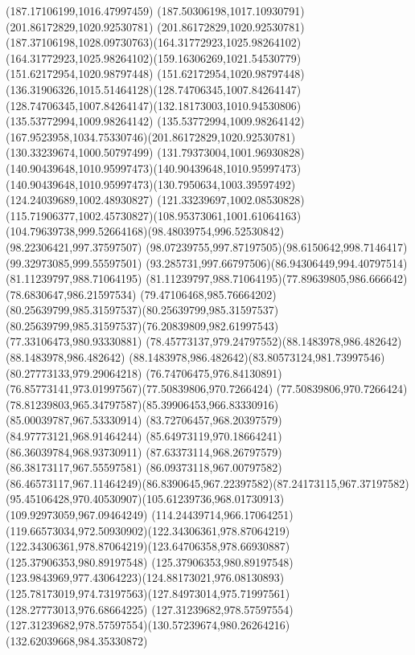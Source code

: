 {{\lineto(187.17106199,1016.47997459)
\lineto(187.50306198,1017.10930791)
\closepath
\moveto(201.86172829,1020.92530781)
\curveto(201.86172829,1020.92530781)(187.37106198,1028.09730763)(164.31772923,1025.98264102)
\curveto(164.31772923,1025.98264102)(159.16306269,1021.54530779)(151.62172954,1020.98797448)
\curveto(151.62172954,1020.98797448)(136.31906326,1015.51464128)(128.74706345,1007.84264147)
\curveto(128.74706345,1007.84264147)(132.18173003,1010.94530806)(135.53772994,1009.98264142)
\curveto(135.53772994,1009.98264142)(167.9523958,1034.75330746)(201.86172829,1020.92530781)
\moveto(130.33239674,1000.50797499)
\curveto(131.79373004,1001.96930828)(140.90439648,1010.95997473)(140.90439648,1010.95997473)
\curveto(140.90439648,1010.95997473)(130.7950634,1003.39597492)(124.24039689,1002.48930827)
\curveto(121.33239697,1002.08530828)(115.71906377,1002.45730827)(108.95373061,1001.61064163)
\curveto(104.79639738,999.52664168)(98.48039754,996.52530842)(98.22306421,997.37597507)
\curveto(98.07239755,997.87197505)(98.6150642,998.7146417)(99.32973085,999.55597501)
\curveto(93.285731,997.66797506)(86.94306449,994.40797514)(81.11239797,988.71064195)
\curveto(81.11239797,988.71064195)(77.89639805,986.666642)(78.6830647,986.21597534)
\curveto(79.47106468,985.76664202)(80.25639799,985.31597537)(80.25639799,985.31597537)
\curveto(80.25639799,985.31597537)(76.20839809,982.61997543)(77.33106473,980.93330881)
\curveto(78.45773137,979.24797552)(88.1483978,986.482642)(88.1483978,986.482642)
\curveto(88.1483978,986.482642)(83.80573124,981.73997546)(80.27773133,979.29064218)
\curveto(76.74706475,976.84130891)(76.85773141,973.01997567)(77.50839806,970.7266424)
\curveto(77.50839806,970.7266424)(78.81239803,965.34797587)(85.39906453,966.83330916)
\lineto(85.00039787,967.53330914)
\lineto(83.72706457,968.20397579)
\lineto(84.97773121,968.91464244)
\lineto(85.64973119,970.18664241)
\lineto(86.36039784,968.93730911)
\lineto(87.63373114,968.26797579)
\lineto(86.38173117,967.55597581)
\lineto(86.09373118,967.00797582)
\curveto(86.46573117,967.11464249)(86.8390645,967.22397582)(87.24173115,967.37197582)
\curveto(95.45106428,970.40530907)(105.61239736,968.01730913)(109.92973059,967.09464249)
\curveto(114.24439714,966.17064251)(119.66573034,972.50930902)(122.34306361,978.87064219)
\curveto(122.34306361,978.87064219)(123.64706358,978.66930887)(125.37906353,980.89197548)
\curveto(125.37906353,980.89197548)(123.9843969,977.43064223)(124.88173021,976.08130893)
\curveto(125.78173019,974.73197563)(127.84973014,975.71997561)(128.27773013,976.68664225)
\lineto(127.31239682,978.57597554)
\curveto(127.31239682,978.57597554)(130.57239674,980.26264216)(132.62039668,984.35330872)
}}
